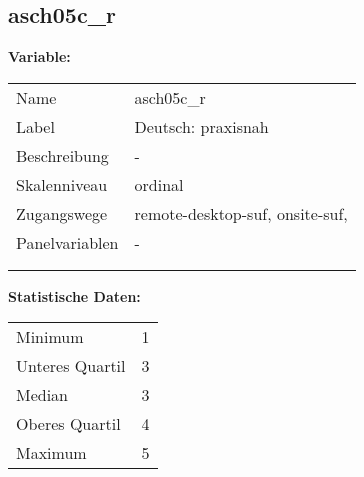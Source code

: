 	
	
	\subsection{asch05c\_r}
	\label{subSection:asch05c_r}

	\noindent\textbf{Variable:}\\
		\begin{tabular}{lL{11.3cm}}
			\label{tableVariable:asch05c_r}
			Name & asch05c\_r \\
			Label & Deutsch: praxisnah \\
			Beschreibung & - \\
			Skalenniveau & ordinal \\
			Zugangswege &
				remote-desktop-suf,
				onsite-suf,
 \\
			Panelvariablen & -
			 \\
			 \\
 \\
		\end{tabular}



		\vspace*{1 cm}
		\noindent\textbf{Statistische Daten:}\\
			\begin{tabular}{ll}
				\label{tableStatistics:asch05c_r}
					Minimum & 1 \\
					Unteres Quartil & 3 \\
					Median & 3 \\
					Oberes Quartil & 4 \\
					Maximum & 5 \\
			\end{tabular}



